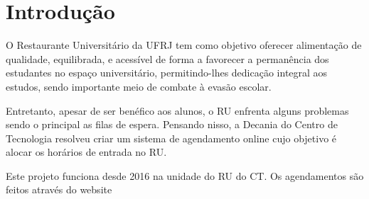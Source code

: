 \chapter{Introdução}

O Restaurante Universitário da UFRJ tem como objetivo oferecer alimentação de qualidade, equilibrada, e 
acessível de forma a favorecer a permanência dos estudantes no espaço universitário, permitindo-lhes 
dedicação integral aos estudos, sendo importante meio de combate à evasão escolar.

Entretanto, apesar de ser benéfico aos alunos, o RU enfrenta alguns problemas sendo o principal as filas
de espera. Pensando nisso, a Decania do Centro de Tecnologia resolveu criar um sistema de agendamento
online cujo objetivo é alocar os horários de entrada no RU.

Este projeto funciona desde 2016 na unidade do RU do CT. Os agendamentos são feitos através do website
